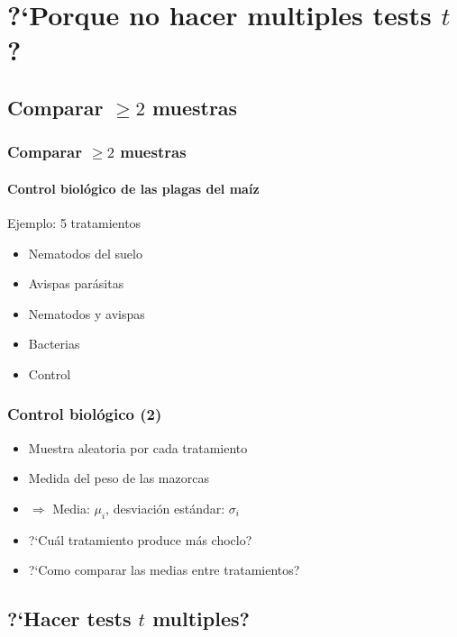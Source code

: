 \documentclass[gray,handout,mathserif]{beamer}
\begin{document}
\section[Introducci\'on]{?`Porque no hacer multiples tests $t$?}

\subsection[Comparar $\geq2$ muestras]{Comparar $\geq2$ muestras}

\begin{frame}[label=anov1]
   \frametitle{Comparar $\geq2$ muestras}
   \framesubtitle{Control biol\'ogico de las plagas del ma\'iz}
   \begin{exampleblock}{Ejemplo: 5 tratamientos}
      \begin{itemize}
         \item Nematodos del suelo
         \item Avispas par\'asitas
         \item Nematodos y avispas
         \item Bacterias
         \item Control
      \end{itemize}
   \end{exampleblock}
\end{frame}%


\begin{frame}[label=anov2]
   \frametitle{Control biol\'ogico (2)}
   \begin{itemize}
      \item Muestra aleatoria por cada tratamiento
      \item Medida del peso de las mazorcas
      \item[ ] $\Rightarrow$ Media: $\mu_i$, desviaci\'on est\'andar: $\sigma_i$
      \item ?`Cu\'al tratamiento produce m\'as choclo?
      \item ?`Como comparar las medias entre tratamientos?
   \end{itemize}
\end{frame}%

 
\subsection[?`Tests $t$ multiples?]{?`Hacer tests $t$ multiples?}
\end{document}
